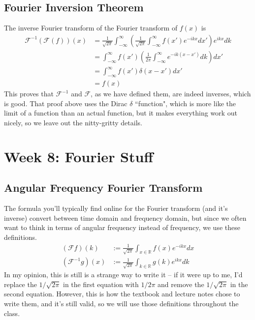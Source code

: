 \documentclass[12pt]{article}
\begin{document}
\subsection{Fourier Inversion Theorem}
The inverse Fourier transform of the Fourier transform of $f(x)$ is
\begin{align*}
    \mathcal{F}^{-1}(\mathcal{F}(f))(x) &= \frac{1}{\sqrt{2 \pi}} \int_{-\infty}^\infty \left( \frac{1}{\sqrt{2 \pi}} \int_{-\infty}^\infty f(x') e^{-ikx} dx' \right) e^{ikx} dk \\
    &= \int_{-\infty}^\infty f(x') \left( \frac{1}{2 \pi} \int_{-\infty}^\infty e^{-ik(x - x')} dk \right) dx' \\
    &= \int_{-\infty}^\infty f(x') \delta(x - x') dx' \\
    &= f(x)
\end{align*}
This proves that $\mathcal{F}^{-1}$ and $\mathcal{F}$, as we have defined them, are indeed inverses, which is good. That proof above uses the Dirac $\delta$ ``function", which is more like the limit of a function than an actual function, but it makes everything work out nicely, so we leave out the nitty-gritty details.

\section{Week 8: Fourier Stuff}

\subsection{Angular Frequency Fourier Transform}
The formula you'll typically find online for the Fourier transform (and it's inverse) convert between time domain and frequency domain, but since we often want to think in terms of angular frequency instead of frequency, we use these definitions.
\begin{align*}
    (\mathcal{F} f)(k) &:= \frac{1}{\sqrt{2 \pi}} \int_{x \in \mathbb{R}} f(x) e^{-ikx} dx \\
    (\mathcal{F}^{-1} g)(x) &:= \frac{1}{\sqrt{2 \pi}} \int_{k \in \mathbb{R}} g(k) e^{ikx} dk
\end{align*}
In my opinion, this is still is a strange way to write it -- if it were up to me, I'd replace the $1/\sqrt{2 \pi}$ in the first equation with $1/2 \pi$ and remove the $1/\sqrt{2 \pi}$ in the second equation. However, this is how the textbook and lecture notes chose to write them, and it's still valid, so we will use those definitions throughout the class.
\end{document}
